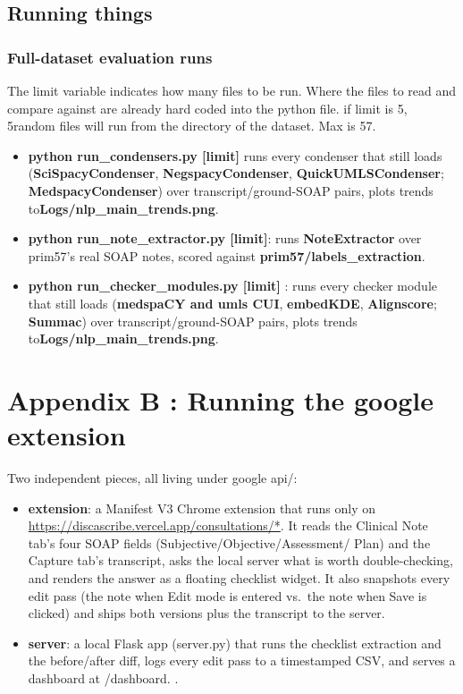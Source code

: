 \documentclass[11pt,a4paper]{article}
\begin{document}
\subsection{Running things}

\subsubsection{Full-dataset evaluation runs}
The limit variable indicates how many files to be run. Where the files to read and compare against are already hard coded into the python file. if limit is 5, 5random files will run from the directory of the dataset. Max is 57.

\begin{itemize}
  \item \textbf{python run\_condensers.py [limit]} runs every condenser that
  still loads (\textbf{SciSpacyCondenser}, \textbf{NegspacyCondenser},
  \textbf{QuickUMLSCondenser}; \textbf{MedspacyCondenser}) over transcript/ground-SOAP pairs, plots trends to\textbf{Logs/nlp\_main\_trends.png}. 

  \item \textbf{python run\_note\_extractor.py [limit]}: runs
  \textbf{NoteExtractor} over prim57's real SOAP notes, scored against
  \textbf{prim57/labels\_extraction}.
  \item \textbf{python run\_checker\_modules.py [limit]} : runs every checker module that
  still loads (\textbf{medspaCY and umls CUI}, \textbf{embedKDE},
  \textbf{Alignscore}; \textbf{Summac}) over transcript/ground-SOAP pairs, plots trends to\textbf{Logs/nlp\_main\_trends.png}. 
\end{itemize}

\newpage

\section{Appendix B : Running the google extension}

Two independent pieces, all living under google api/:

\begin{itemize}
  \item \textbf{extension}:  a Manifest V3 Chrome extension that
  runs only on \url{https://discascribe.vercel.app/consultations/*}. It reads
  the Clinical Note tab's four SOAP fields (Subjective/Objective/Assessment/
  Plan) and the Capture tab's transcript, asks the local server what is
  worth double-checking, and renders the answer as a floating checklist
  widget. It also snapshots every edit pass (the note when Edit mode is
  entered vs.\ the note when Save is clicked) and ships both versions plus
  the transcript to the server.
  \item \textbf{server}:  a local Flask app (server.py) that
  runs the checklist extraction and the before/after diff, logs every edit
  pass to a timestamped CSV, and serves a dashboard at /dashboard.
  .
\end{itemize}
\end{document}
